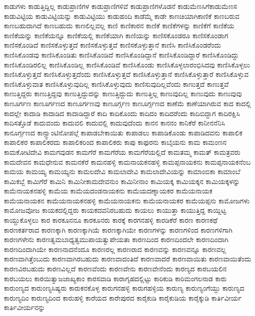 {ಕಾಡುಗಳು
ಕಾಡುತ್ತಿದ್ದಿಲ್ಲ
ಕಾಡುಪ್ರಾಣಿಗಳ
ಕಾಡುಪ್ರಾಣಿಗಳಿವೆ
ಕಾಡುಪ್ರಾಣಿಗಳೊಡನೆ
ಕಾಡುಮೆಣಸಿಗೆಕಾಡುಮೆಣಸ
ಕಾಡುವಿಟ್ಟಿಯ
ಕಾಡುವಿಟ್ಟಿಯನ್ನು
ಕಾಡುವಿಟ್ಟಿಯು
ಕಾಡುಹಂದಿ
ಕಾಡೆಮ್ಮೆ
ಕಾಡೇ
ಕಾಣಚಿಯಾಗಿಕಾಣಿಕೆ
ಕಾಣಬರುವ
ಕಾಣಬಹುದಾಗಿದೆ
ಕಾಣಬಹುದು
ಕಾಣಲಿಲ್ಲವಲ್ಲ
ಕಾಣಿ
ಕಾಣಿಕಾರನ
ಕಾಣಿಕೆ
ಕಾಣಿಕೆಗಳನ್ನು
ಕಾಣಿಕೆಗೆ
ಕಾಣಿಕೆಯ
ಕಾಣಿಕೆಯನ್ನು
ಕಾಣಿಕೆಯನ್ನೂ
ಕಾಣಿಕೆಯಲ್ಲಿ
ಕಾಣಿಕೆಯಾಗಿ
ಕಾಣಿಯನ್ನು
ಕಾಣಿಸಕೊಂಡರೂ
ಕಾಣಿಸಕೊಂಡಾಗ
ಕಾಣಿಸಕೊಂಡಿದೆ
ಕಾಣಿಸಕೊಳ್ಳುತ್ತದೆ
ಕಾಣಿಸಕೊಳ್ಳುತ್ತವೆ
ಕಾಣಿಸಕೊಳ್ಳುತ್ತಾನೆ
ಕಾಣಿಸಿ
ಕಾಣಿಸಿಕೊಂಡರೆಂದು
ಕಾಣಿಸಿಕೊಂಡವು
ಕಾಣಿಸಿಕೊಂಡಿತು
ಕಾಣಿಸಿಕೊಂಡಿದೆ
ಕಾಣಿಸಿಕೊಂಡಿದ್ದಾನೆ
ಕಾಣಿಸಿಕೊಂಡಿದ್ದಾರೆ
ಕಾಣಿಸಿಕೊಂಡಿದ್ದು
ಕಾಣಿಸಿಕೊಂಡಿರಲಿಲ್ಲ
ಕಾಣಿಸಿಕೊಂಡಿಲ್ಲ
ಕಾಣಿಸಿಕೊಂಡಿವೆ
ಕಾಣಿಸಿಕೊಂಡು
ಕಾಣಿಸಿಕೊಳ್ಳಲಾರಂಭಿಸಿದವು
ಕಾಣಿಸಿಕೊಳ್ಳಲು
ಕಾಣಿಸಿಕೊಳ್ಳುತ್ತದೆ
ಕಾಣಿಸಿಕೊಳ್ಳುತ್ತದೆಂದು
ಕಾಣಿಸಿಕೊಳ್ಳುತ್ತವೆ
ಕಾಣಿಸಿಕೊಳ್ಳುತ್ತಾನೆ
ಕಾಣಿಸಿಕೊಳ್ಳುತ್ತಾರೆ
ಕಾಣಿಸಿಕೊಳ್ಳುವ
ಕಾಣಿಸಿಕೊಳ್ಳುವಾತ
ಕಾಣಿಸಿಕೊಳ್ಳುವುದಿಲ್ಲ
ಕಾಣಿಸಿಕೊಳ್ಳುವುದು
ಕಾಣಿಸುವುದಿಲ್ಲವೆಂದು
ಕಾಣುತ್ತದೆ
ಕಾಣುತ್ತವೆ
ಕಾಣುತ್ತಿದ್ದರು
ಕಾಣುತ್ತಿದ್ದವು
ಕಾಣುತ್ತಿದ್ದುದನ್ನು
ಕಾಣುತ್ತಿದ್ದುದು
ಕಾಣುತ್ತಿಲ್ಲ
ಕಾಣುವುದಿಲ್ಲ
ಕಾಣುವುದು
ಕಾಣುವುವು
ಕಾಣೂರ್ಗಣ
ಕಾಣೂರ್ಗಣದ
ಕಾಣೂರ್ಗಣವು
ಕಾಣೂರ್ಗ್ಗಣ
ಕಾಣೂರ್ಗ್ಗಣದ
ಕಾಣೆಮೆ
ಕಾಣೆಯಾಗಿರುವ
ಕಾದ
ಕಾದಲ್ಲಿ
ಕಾದಲ್ಲೇ
ಕಾದಾಡಿ
ಕಾದಾಡಿದ
ಕಾದಾಡಿದ್ದಾರೆ
ಕಾದಿ
ಕಾದಿಕೊಂದು
ಕಾದಿದಂ
ಕಾದಿದರೆಂದು
ಕಾದಿಬಿದ್ದಾಗ
ಕಾದಿರಕ್ಷಿಸಿ
ಕಾದಿಸತ್ತೊಡೆ
ಕಾದುವಂದು
ಕಾದುವಲಿ
ಕಾದುವಲ್ಲಿ
ಕಾದುವುದೆಂದು
ಕಾನನ
ಕಾನನಂ
ಕಾನಿಕೆರೆ
ಕಾನೀನನೆನಿಸಿ
ಕಾನೂರ್ಗ್ಗಣದ
ಕಾನ್ಸ್ಟಾಂಟಿನೋಪಲ್ಗೆ
ಕಾಪಾಡಬೇಕಾಯಿತು
ಕಾಪಾಡಲು
ಕಾಪಾಡಿಕೊಂಡು
ಕಾಪಾಡಿದವನು
ಕಾಪಾಲಿಕ
ಕಾಪಾಲಿಕರ
ಕಾಪಾಲಿಕರದು
ಕಾಪಾಲಿಕರಿಂದ
ಕಾಪಾಲಿಕರು
ಕಾಪು
ಕಾಫುರನು
ಕಾಬೈಯನು
ಕಾಮ
ಕಾಮಂಣನ
ಕಾಮಕೋಟಿದೇವಿ
ಕಾಮಗವುಡನ
ಕಾಮಗೆರೆ
ಕಾಮಗೆರೆಯ
ಕಾಮಗೆರೆಯಲ್ಲಿದೆ
ಕಾಮತಮ್ಮ
ಕಾಮತ್
ಕಾಮತ್ರವರು
ಕಾಮದೇವನ
ಕಾಮಧೇನುವ
ಕಾಮನಕೆರೆ
ಕಾಮನಹಳ್ಳಿ
ಕಾಮನಾಯಕನಹಳ್ಳಿ
ಕಾಮಪ್ಪನಾಯಕನು
ಕಾಮಪ್ಪನಾಯಕನೆಂಬ
ಕಾಮಯ
ಕಾಮಯ್ಯ
ಕಾಮಯ್ಯನು
ಕಾಮಲದೇವಿ
ಕಾಮಲಾದೇವಿ
ಕಾಮಲಾದೇವಿಯನ್ನು
ಕಾಮಾಂಬಿಕಾ
ಕಾಮಾಂಬೆ
ಕಾಮಿಕಬ್ಬೆ
ಕಾಮಿಗೆರೆ
ಕಾಮಿನಿ
ಕಾಮಿನೀಕಾಮದೇವನುಂ
ಕಾಮಿನೀನಾಂ
ಕಾಮಿಯಕ್ಕ
ಕಾಮಿಯಕ್ಕನ
ಕಾಮಿಯಕ್ಕಳನ್ನು
ಕಾಮೆನಾಯಕನಹಳ್ಳಿ
ಕಾಮೆಯ
ಕಾಮೆಯದಂಡನಾಯಕನು
ಕಾಮೆಯದಣ್ನಾಯಕರ
ಕಾಮೆಯನಾಯಕ
ಕಾಮೆಯನಾಯಕನ
ಕಾಮೆಯನಾಯಕನಹಳ್ಳಿ
ಕಾಮೆಯನಾಯಕನು
ಕಾಮೆಯನಾಯಕರ
ಕಾಮೆಯಪ್ಪನು
ಕಾಮೋಜಗಳು
ಕಾಮೋಜವೋಜ
ಕಾಯಕದಲ್ಲಿದ್ದರು
ಕಾಯಕದವನಿರಬಹುದು
ಕಾಯಲು
ಕಾಯುತ್ತಾ
ಕಾಯುತ್ತಿದ್ದ
ಕಾಯ್ದಿಟ್ಟ
ಕಾಯ್ದುಕೊಳ್ಳಲು
ಕಾರ
ಕಾರಕೂನನೂ
ಕಾರಕೂನರು
ಕಾರಕ್ಕೆ
ಕಾರಗನಹಳ್ಳಿ
ಕಾರಡಿಕೆರೆ
ಕಾರಣ
ಕಾರಣಕಥೆ
ಕಾರಣಕರ್ತರಾದ
ಕಾರಣಕ್ಕಾಗಿ
ಕಾರಣಕ್ಕಾಗಿಯೆ
ಕಾರಣಕ್ಕಾಗಿಯೇ
ಕಾರಣಗಳನ್ನು
ಕಾರಣಗಳಿಂದ
ಕಾರಣಗಳಿಗಾಗಿ
ಕಾರಣಗಳೇನು
ಕಾರಣತ್ವಮಬಾಧ್ಯತ್ವಮುಪಾಯತ್ವುಪೇಯತಾ
ಕಾರಣದಿಂದ
ಕಾರಣದಿಂದಲೇ
ಕಾರಣದಿಂದಾಗಿ
ಕಾರಣದಿಂದಾಗಿಯೇ
ಕಾರಣನಾದನೆಂದೂ
ಕಾರಣರಲ್ಲ
ಕಾರಣರಾದ
ಕಾರಣವನ್ನು
ಕಾರಣವನ್ನೂ
ಕಾರಣವಲ್ಲ
ಕಾರಣವಾಗಿತ್ತೆಂಬುದು
ಕಾರಣವಾಗಿರಬಹುದು
ಕಾರಣವಾದಂತಿದೆ
ಕಾರಣವಾದರೆ
ಕಾರಣವಾಯಿತು
ಕಾರಣವಾಯಿತೆಂದು
ಕಾರಣವಿರಬಹುದು
ಕಾರಣವಿಲ್ಲದೆ
ಕಾರಣವೆಂದು
ಕಾರಣವೇನು
ಕಾರಣವೇನೆಂದು
ಕಾರಣ್ಯದ
ಕಾರಬಯಲಿನ
ಕಾರಬಯಲು
ಕಾರಯಿತ್ವಾಜಜಾಖ್ಯಕಾಂ
ಕಾರಸವಾಡಿ
ಕಾರಾಗೃಹದಲ್ಲಿಟ್ಟು
ಕಾರಿಕುಡಿ
ಕಾರಿಮಂಗಲನಾಡ
ಕಾರು
ಕಾರುಂಣ್ಯದ
ಕಾರುಂಣ್ಯಸಿಷ್ಯರು
ಕಾರುಕನಕೊಳ್ಳ
ಕಾರುಗನಹಳ್ಳಿ
ಕಾರುಗಹಳ್ಳಿಯ
ಕಾರುಣ್ಯ
ಕಾರುಣ್ಯಂಗೆಯ್ದು
ಕಾರುಣ್ಯದ
ಕಾರುಣ್ಯದಿಂ
ಕಾರುಣ್ಯದಿಂದ
ಕಾರುಹಳ್ಳಿ
ಕಾರೆಯದ
ಕಾರೇಪುರದ
ಕಾರೈಕುಡಿ
ಕಾರೈಕುಡಿಯ
ಕಾರೈಕ್ಕುಡಿ
ಕಾರ್ತಿವೀರ್ಯ
ಕಾರ್ತಿವೀರ್ಯನನ್ನು
}
